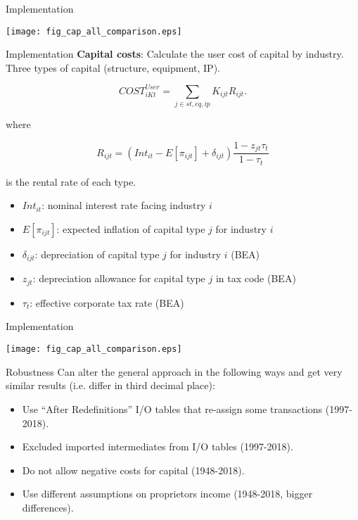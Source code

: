 \documentclass[10pt,xcolor=dvipsnames]{beamer}
\begin{document}
\begin{frame}{Implementation}
\begin{center}
\texttt{[image: fig\_cap\_all\_comparison.eps]}
\end{center}
\end{frame}

\begin{frame}{Implementation}\label{Susercost}
\textbf{Capital costs}: Calculate the user cost of capital by industry. Three types of capital (structure, equipment, IP).

\begin{equation}
  COST^{User}_{iKt} = \sum_{j \in st,eq,ip} K_{ijt} R_{ijt}.
\end{equation}

where 

\begin{equation}
  R_{ijt} = (Int_{it} - E[\pi_{ijt}] + \delta_{ijt})\frac{1-z_{jt} \tau_t}{1-\tau_t}
\end{equation}

is the rental rate of each type. 

\begin{itemize}
  \item $Int_{it}$: nominal interest rate facing industry $i$
  \item $E[\pi_{ijt}]$: expected inflation of capital type $j$ for industry $i$
  \item $\delta_{ijt}$: depreciation of capital type $j$ for industry $i$ (BEA)
  \item $z_{jt}$: depreciation allowance for capital type $j$ in tax code (BEA)
  \item $\tau_t$: effective corporate tax rate (BEA)
\end{itemize}
\vspace{.25in} \hfill \hyperlink{Ausercost}{}
\end{frame}

\begin{frame}{Implementation}
\begin{center}
\texttt{[image: fig\_cap\_all\_comparison.eps]}
\end{center}
\end{frame}

\begin{frame}{Robustness}
Can alter the general approach in the following ways and get very similar results (i.e. differ in third decimal place):
\begin{itemize}
  \item Use ``After Redefinitions'' I/O tables that re-assign some transactions (1997-2018). 
  \item Excluded imported intermediates from I/O tables (1997-2018). 
  \item Do not allow negative costs for capital (1948-2018). 
  \item Use different assumptions on proprietors income (1948-2018, bigger differences).
\end{itemize}
\end{frame}
\end{document}
